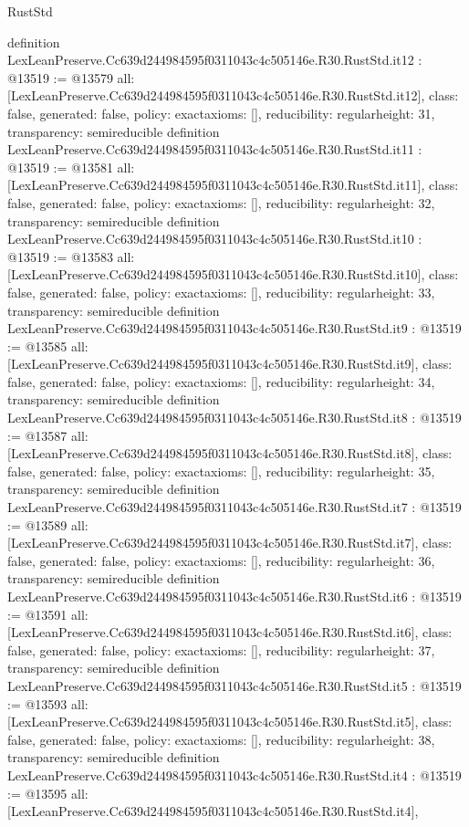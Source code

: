 \begin{lexlean}{RustStd}
\begin{coremodule}
{}
definition LexLeanPreserve.Cc639d244984595f0311043c4c505146e.R30.RustStd.it12 : @13519 := @13579 {
  all: [LexLeanPreserve.Cc639d244984595f0311043c4c505146e.R30.RustStd.it12],
  class: false,
  generated: false,
  policy: exact{axioms: []},
  reducibility: regular{height: 31},
  transparency: semireducible
}
definition LexLeanPreserve.Cc639d244984595f0311043c4c505146e.R30.RustStd.it11 : @13519 := @13581 {
  all: [LexLeanPreserve.Cc639d244984595f0311043c4c505146e.R30.RustStd.it11],
  class: false,
  generated: false,
  policy: exact{axioms: []},
  reducibility: regular{height: 32},
  transparency: semireducible
}
definition LexLeanPreserve.Cc639d244984595f0311043c4c505146e.R30.RustStd.it10 : @13519 := @13583 {
  all: [LexLeanPreserve.Cc639d244984595f0311043c4c505146e.R30.RustStd.it10],
  class: false,
  generated: false,
  policy: exact{axioms: []},
  reducibility: regular{height: 33},
  transparency: semireducible
}
definition LexLeanPreserve.Cc639d244984595f0311043c4c505146e.R30.RustStd.it9 : @13519 := @13585 {
  all: [LexLeanPreserve.Cc639d244984595f0311043c4c505146e.R30.RustStd.it9],
  class: false,
  generated: false,
  policy: exact{axioms: []},
  reducibility: regular{height: 34},
  transparency: semireducible
}
definition LexLeanPreserve.Cc639d244984595f0311043c4c505146e.R30.RustStd.it8 : @13519 := @13587 {
  all: [LexLeanPreserve.Cc639d244984595f0311043c4c505146e.R30.RustStd.it8],
  class: false,
  generated: false,
  policy: exact{axioms: []},
  reducibility: regular{height: 35},
  transparency: semireducible
}
definition LexLeanPreserve.Cc639d244984595f0311043c4c505146e.R30.RustStd.it7 : @13519 := @13589 {
  all: [LexLeanPreserve.Cc639d244984595f0311043c4c505146e.R30.RustStd.it7],
  class: false,
  generated: false,
  policy: exact{axioms: []},
  reducibility: regular{height: 36},
  transparency: semireducible
}
definition LexLeanPreserve.Cc639d244984595f0311043c4c505146e.R30.RustStd.it6 : @13519 := @13591 {
  all: [LexLeanPreserve.Cc639d244984595f0311043c4c505146e.R30.RustStd.it6],
  class: false,
  generated: false,
  policy: exact{axioms: []},
  reducibility: regular{height: 37},
  transparency: semireducible
}
definition LexLeanPreserve.Cc639d244984595f0311043c4c505146e.R30.RustStd.it5 : @13519 := @13593 {
  all: [LexLeanPreserve.Cc639d244984595f0311043c4c505146e.R30.RustStd.it5],
  class: false,
  generated: false,
  policy: exact{axioms: []},
  reducibility: regular{height: 38},
  transparency: semireducible
}
definition LexLeanPreserve.Cc639d244984595f0311043c4c505146e.R30.RustStd.it4 : @13519 := @13595 {
  all: [LexLeanPreserve.Cc639d244984595f0311043c4c505146e.R30.RustStd.it4],
}
\end{coremodule}
\end{lexlean}
